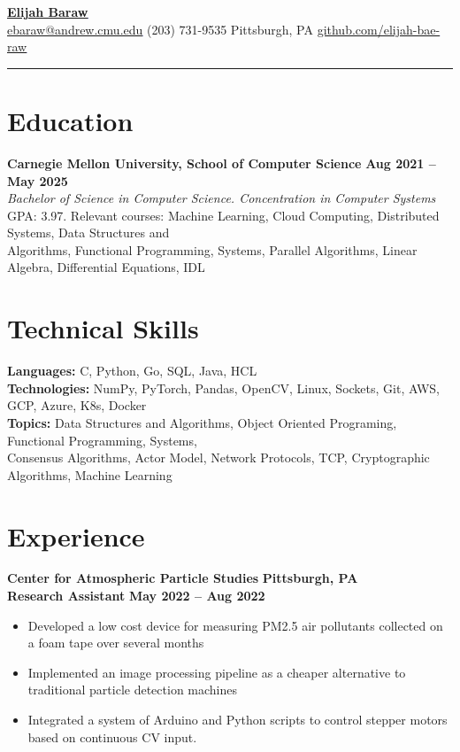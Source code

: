 \documentclass[fontsize=12pt]{scrartcl}
\let\oldhref\href
\renewcommand{\href}[2]{\textcolor{blue}{\underline{\oldhref{#1}{#2}}}}
\begin{document}
\begin{center}
    {\LARGE \textbf{\href{https://www.elijahbaraw.com/}{Elijah Baraw}}} \\
    \vspace{2pt}
    \large{\href{mailto:ebaraw@andrew.cmu.edu?subject=RE:\%20Your\%20Resume}{ebaraw@andrew.cmu.edu} \textbar\space(203) 731-9535 \textbar\space Pittsburgh, PA \textbar\space\href{https://github.com/elijah-bae-raw}{github.com/elijah-bae-raw}}
\end{center}
\vspace{-18pt}
\rule{\textwidth}{0.4pt}
\vspace{-18pt}

\section{Education}
\textbf{Carnegie Mellon University, School of Computer Science} \hfill \textbf{Aug 2021 -- May 2025} \\
\textit{Bachelor of Science in Computer Science. Concentration in Computer Systems} \\
GPA\@: 3.97. Relevant courses: Machine Learning, Cloud Computing, Distributed Systems, Data Structures and \\ Algorithms, Functional Programming, Systems, Parallel Algorithms, Linear Algebra, Differential Equations, IDL

\section{Technical Skills}
\textbf{Languages:} C, Python, Go, SQL, Java, HCL \\
\textbf{Technologies:} NumPy, PyTorch, Pandas, OpenCV, Linux, Sockets, Git, AWS, GCP, Azure, K8s, Docker \\
\textbf{Topics:} Data Structures and Algorithms, Object Oriented Programing, Functional Programming, Systems, \\Consensus Algorithms, Actor Model, Network Protocols, TCP, Cryptographic Algorithms, Machine Learning

\section{Experience}
{\large\textbf{Center for Atmospheric Particle Studies}} \hfill \textbf{Pittsburgh, PA} \\
\textbf{Research Assistant} \hfill \textbf{May 2022 -- Aug 2022}
\begin{itemize}
    \item Developed a low cost device for measuring PM2.5 air pollutants collected on a foam tape over several months
    \item Implemented an image processing pipeline as a cheaper alternative to traditional particle detection machines
    \item Integrated a system of Arduino and Python scripts to control stepper motors based on continuous CV input.
\end{itemize}
\end{document}
